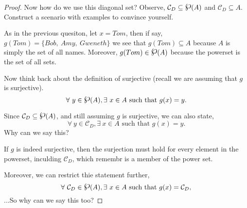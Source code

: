 \begin{proof}
 
Now how do we use this diagonal set?  Observe, $ \mathcal{C}_D\subseteq \powerset (A)$ and $ \mathcal{C}_D\subseteq  A$.  Construct a scenario with examples to convince yourself.


\ifKey\hfill\begin{minipage}{0.5\textwidth}\color{red}As in the previous quesiton, let $x = Tom$, then if say, $g(Tom) = \{ Bob, ~Amy, ~Gweneth\} $ we see that $g(Tom) \subseteq A$ because $A$ is simply the set of all names.  Moreover, $g(Tom)\in \powerset(A)$ because the powerset is the set of all sets.\color{black}\end{minipage}
\fi

Now think back about the definition of surjective (recall we are assuming that $g$ is surjective).
$$ \forall ~y\in \powerset (A), \exists~ x\in A \textrm{ such that } g(x) = y.$$

Since $ \mathcal{C}_D\subseteq \powerset (A)$, and still assuming $g$ is surjective, we can also state, 
$$ \forall ~y\in  \mathcal{C}_D, \exists~ x\in A \textrm{ such that } g(x) = y.$$
Why can we say this?

\ifKey\hfill\begin{minipage}{0.5\textwidth}\color{red}If $g$ is indeed surjective, then the surjection must hold for every element in the powerset, inculding $\mathcal{C}_D$, which remembr is a member of the power set.\color{black}\end{minipage}
\fi

Moreover, we can restrict thie statement further, 
$$ \forall  ~\mathcal{C}_D\in \powerset (A), \exists~ x\in A \textrm{ such that } g(x) = \mathcal{C}_D,$$
...So why can we say this too?


\end{proof}

